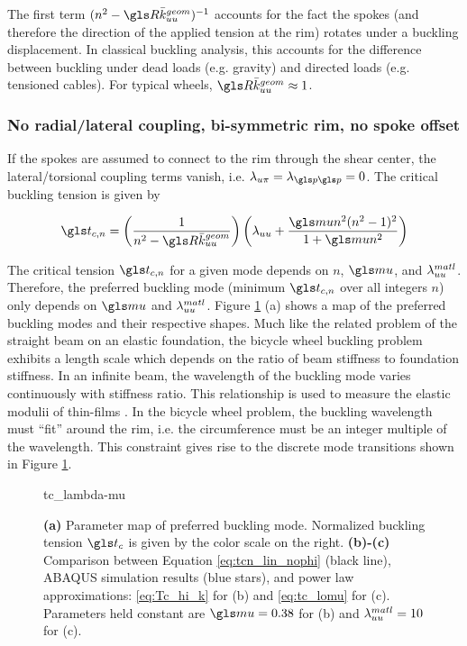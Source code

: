 \documentclass[\rootdir/thesis.tex]{subfiles}
\begin{document}
The first term $(n^2 - \R\geom{\kuu})^{-1}$ accounts for the fact the spokes (and therefore the direction of the applied tension at the rim) rotates under a buckling displacement. In classical buckling analysis, this accounts for the difference between buckling under dead loads (e.g. gravity) and directed loads (e.g. tensioned cables). For typical wheels, $\R\geom{\kuu} \approx 1$.

\subsubsection*{No radial/lateral coupling, bi-symmetric rim, no spoke offset}
If the spokes are assumed to connect to the rim through the shear center, the lateral/torsional coupling terms vanish, i.e. $\lr_{u\pi}=\lr_{\p\p}=0$. The critical buckling tension is given by

\begin{equation}
\label{eq:tcn_lin_nophi}
\ts_{c,n} = \left(\frac{1}{n^2 - \R\geom{\kuu}}\right)
\left(\lr_{uu}
      +\frac{\m n^2(n^2-1)^2}
        {1 + \m n^2}\right)
\end{equation}

The critical tension $\ts_{c,n}$ for a given mode depends on $n$, $\m$, and $\lambda_{uu}^{matl}$. Therefore, the preferred buckling mode (minimum $\ts_{c,n}$ over all integers $n$) only depends on $\m$ and $\lambda_{uu}^{matl}$. Figure \ref{fig:tc_lambda_mu} (a) shows a map of the preferred buckling modes and their respective shapes. Much like the related problem of the straight beam on an elastic foundation, the bicycle wheel buckling problem exhibits a length scale which depends on the ratio of beam stiffness to foundation stiffness. In an infinite beam, the wavelength of the buckling mode varies continuously with stiffness ratio. This relationship is used to measure the elastic modulii of thin-films \cite{Suo Hutchinson or Huang}. In the bicycle wheel problem, the buckling wavelength must ``fit'' around the rim, i.e. the circumference must be an integer multiple of the wavelength. This constraint gives rise to the discrete mode transitions shown in Figure \ref{fig:tc_lambda_mu}.

\begin{figure}
\centering
{tc_lambda-mu}
\caption{\textbf{(a)} Parameter map of preferred buckling mode. Normalized buckling tension $\ts_c$ is given by the color scale on the right. \textbf{(b)-(c)} Comparison between Equation \eqref{eq:tcn_lin_nophi} (black line), ABAQUS simulation results (blue stars), and power law approximations: \eqref{eq:Tc_hi_k} for (b) and \eqref{eq:tc_lomu} for (c). Parameters held constant are $\m=0.38$ for (b) and $\lambda_{uu}^{matl}=10$ for (c).}
\label{fig:tc_lambda_mu}
\end{figure}
\end{document}
